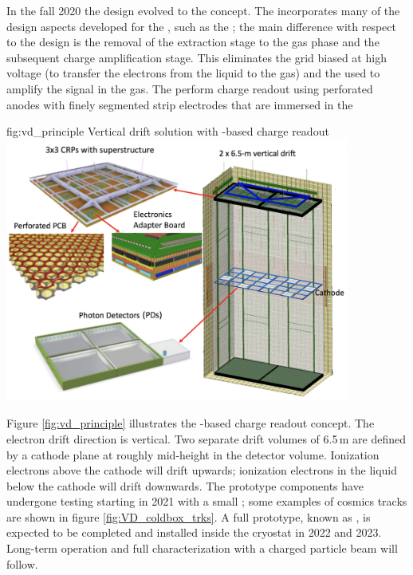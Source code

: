 \documentclass[../main-v1.tex]{subfiles}
\begin{document}
In the fall 2020 the  design evolved to the  concept. The  incorporates many of the design aspects developed for the , such as the ;   the  main  difference  with  respect  to  the    design  is   the  removal  of  the  extraction  stage  to  the  gas  phase  and  the  subsequent  charge  amplification  stage.  %
This eliminates the grid biased at high voltage (to transfer the electrons from the liquid to the gas) and the  used to amplify the signal in the gas. The   %
perform charge readout using %
perforated  anodes with finely segmented strip electrodes %
that are immersed in the 
 

\begin{dunefigure}
{fig:vd_principle}
{Vertical drift solution with -based charge readout}
\includegraphics[width=0.85\textwidth]{graphics/IntroFigures/Fig_13_VD_solution.png}
\end{dunefigure}

 Figure \ref{fig:vd_principle} illustrates the -based charge readout concept. The electron drift direction is vertical.
Two separate drift volumes of 6.5\,m are defined by a cathode plane at roughly mid-height in the
detector volume. Ionization electrons above the cathode will drift upwards; ionization electrons in the liquid below the cathode will drift downwards.
The   prototype components have undergone testing starting in 2021 with a small \coldbox; some examples of cosmics tracks are shown in figure \ref{fig:VD_coldbox_trks}. A full prototype, known as , is expected to be completed and  installed 
 inside the  cryostat in 2022 and 2023. Long-term operation and full characterization with a charged particle beam will follow. 
\end{document}

